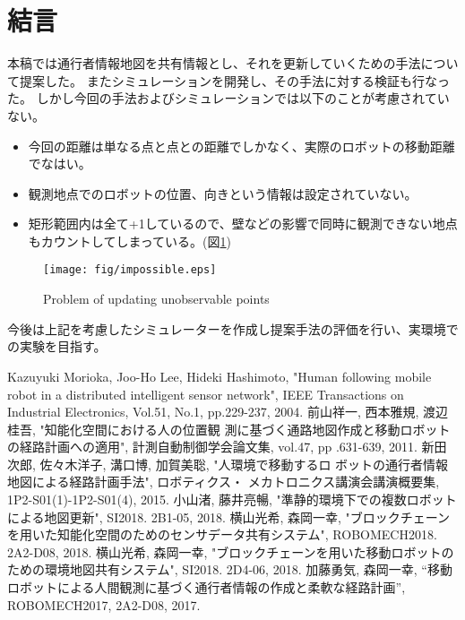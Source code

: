 \documentclass{jsarticle}
\begin{document}
\section{結言}
本稿では通行者情報地図を共有情報とし、それを更新していくための手法について提案した。
またシミュレーションを開発し、その手法に対する検証も行なった。
しかし今回の手法およびシミュレーションでは以下のことが考慮されていない。
\begin{itemize}
  \item 今回の距離は単なる点と点との距離でしかなく、実際のロボットの移動距離でなはい。
  \item 観測地点でのロボットの位置、向きという情報は設定されていない。
  \item 矩形範囲内は全て+1しているので、壁などの影響で同時に観測できない地点もカウントしてしまっている。(図\ref{fig: impossible})
\end{itemize}
\begin{figure}[tbh]
 \centering
  \texttt{[image: fig/impossible.eps]}
  \vspace*{-4mm}
  \caption{Problem of updating unobservable points}
  \label{fig: impossible}
\end{figure}

今後は上記を考慮したシミュレーターを作成し提案手法の評価を行い、実環境での実験を目指す。


\footnotesize
\begin{thebibliography}{99}

Kazuyuki Morioka, Joo-Ho Lee, Hideki Hashimoto, "Human following mobile robot in a distributed intelligent sensor network", IEEE Transactions on Industrial Electronics, Vol.51, No.1, pp.229-237, 2004.
前山祥一, 西本雅規, 渡辺桂吾, "知能化空間における人の位置観 測に基づく通路地図作成と移動ロボットの経路計画への適用", 計測自動制御学会論文集, vol.47, pp .631-639, 2011.
新田次郎, 佐々木洋子, 溝口博, 加賀美聡, "人環境で移動するロ ボットの通行者情報地図による経路計画手法", ロボティクス・ メカトロニクス講演会講演概要集, 1P2-S01(1)-1P2-S01(4), 2015.
小山渚, 藤井亮暢, "準静的環境下での複数ロボットによる地図更新", SI2018. 2B1-05, 2018.
横山光希, 森岡一幸, "ブロックチェーンを用いた知能化空間のためのセンサデータ共有システム", ROBOMECH2018. 2A2-D08, 2018.
横山光希, 森岡一幸, "ブロックチェーンを用いた移動ロボットのための環境地図共有システム", SI2018. 2D4-06, 2018.
加藤勇気, 森岡一幸, “移動ロボットによる人間観測に基づく通行者情報の作成と柔軟な経路計画”, ROBOMECH2017, 2A2-D08, 2017.
\end{thebibliography}

\normalsize
\end{document}
